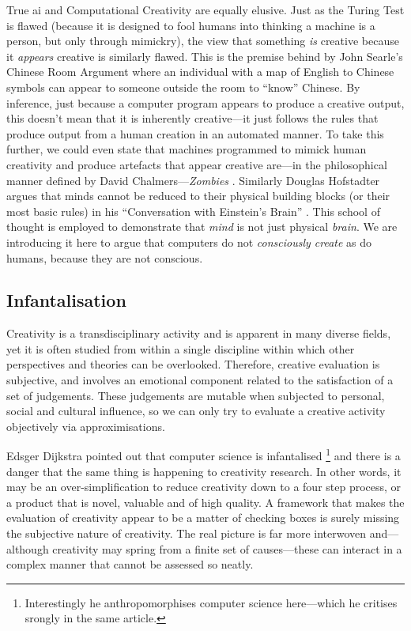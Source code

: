 True \gls{ai} and Computational Creativity are equally elusive. Just as the Turing Test \autocite{Turing1950} is flawed (because it is designed to fool humans into thinking a machine is a person, but only through mimickry), the view that something \textit{is} creative because it \textit{appears} creative is similarly flawed. This is the premise behind by John Searle's Chinese Room Argument \autocite{Searle1980} where an individual with a map of English to Chinese symbols can appear to someone outside the room to ``know'' Chinese. By inference, just because a computer program appears to produce a creative output, this doesn't mean that it is inherently creative---it just follows the rules that produce output from a human creation in an automated manner. To take this further, we could even state that machines programmed to mimick human creativity and produce artefacts that appear creative are---in the philosophical manner defined by David Chalmers---\textit{Zombies} \autocite{Chalmers1996}. Similarly Douglas Hofstadter argues that minds cannot be reduced to their physical building blocks (or their most basic rules) in his ``Conversation with Einstein's Brain'' \autocite{Hofstadter1981}. This school of thought is employed to demonstrate that \textit{mind} is not just physical \textit{brain}. \colorbox{red!30}{We} are introducing it here to argue that computers do not \textit{consciously create} as do humans, because they are not conscious.


\subsection{Infantalisation}

Creativity is a transdisciplinary activity and is apparent in many diverse fields, yet it is often studied from within a single discipline within which other perspectives and theories can be overlooked. Therefore, creative evaluation is subjective, and involves an emotional component related to the satisfaction of a set of judgements. These judgements are mutable when subjected to personal, social and cultural influence, so we can only try to evaluate a creative activity objectively via approximisations.

Edsger Dijkstra pointed out that computer science is infantalised \autocite{Dijkstra1988}\footnote{Interestingly he anthropomorphises computer science here---which he critises srongly in the same article.} and there is a danger that the same thing is happening to creativity research. In other words, it may be an over-simplification to reduce creativity down to a four step process, or a product that is novel, valuable and of high quality. A framework that makes the evaluation of creativity appear to be a matter of checking boxes is surely missing the subjective nature of creativity. The real picture is far more interwoven and---although creativity may spring from a finite set of causes---these can interact in a complex manner that cannot be assessed so neatly.

